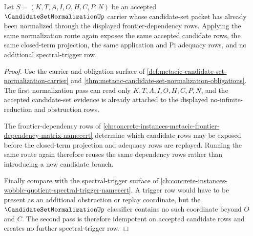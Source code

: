 \begin{theorem}
\label{thm:metacic-candidate-set-normalization-idempotence}
Let $S=(K,T,A,I,O,H,C,P,N)$ be an accepted $\CandidateSetNormalizationUp$ carrier whose candidate-set packet has already been normalized through the displayed frontier-dependency rows. Applying the same normalization route again exposes the same accepted candidate rows, the same closed-term projection, the same application and Pi adequacy rows, and no additional spectral-trigger row.
\end{theorem}
\begin{proof}
Use the carrier and obligation surface of \autoref{def:metacic-candidate-set-normalization-carrier} and \autoref{thm:metacic-candidate-set-normalization-obligations}. The first normalization pass can read only $K,T,A,I,O,H,C,P,N$, and the accepted candidate-set evidence is already attached to the displayed no-infinite-reduction and obstruction rows.

The frontier-dependency rows of \autoref{ch:concrete-instances-metacic-frontier-dependency-matrix-namecert} determine which candidate rows may be exposed before the closed-term projection and adequacy rows are replayed. Running the same route again therefore reuses the same dependency rows rather than introducing a new candidate branch.

Finally compare with the spectral-trigger surface of \autoref{ch:concrete-instances-wobble-quotient-spectral-trigger-namecert}. A trigger row would have to be present as an additional obstruction or replay coordinate, but the $\CandidateSetNormalizationUp$ classifier contains no such coordinate beyond $O$ and $C$. The second pass is therefore idempotent on accepted candidate rows and creates no further spectral-trigger row.
\end{proof}




